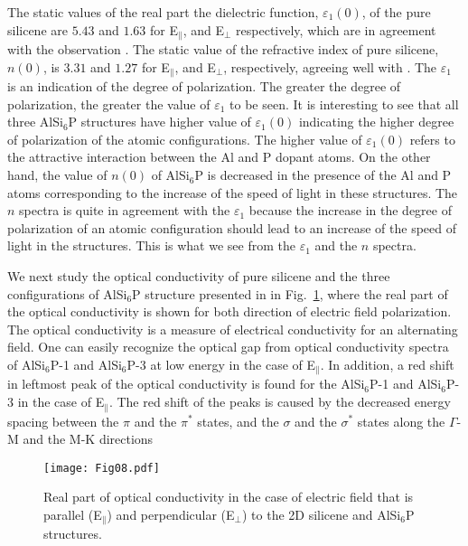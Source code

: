 \documentclass[5p,twocolumn]{elsarticle}
\def\fig#1{Fig.\ \ref{#1}}
\begin{document}
The static values of the real part the dielectric function, $\varepsilon_1(0)$, of the pure silicene are $5.43$ and $1.63$ for E$_{\parallel}$, and  E$_{\bot}$ respectively, which are in agreement
with the observation \cite{C4RA07976K}. The static value of the refractive index of pure silicene, $n(0)$, is $3.31$ and $1.27$ for E$_{\parallel}$, and  E$_{\bot}$, respectively, agreeing well with \cite{doi:10.1063/1.5062764}. The $\varepsilon_1$ is an indication of the degree of polarization. The greater the degree of polarization, the greater the value of $\varepsilon_1$ to be seen. It is interesting to see that all three AlSi$_6$P structures have higher value of $\varepsilon_1(0)$ indicating the higher degree of polarization of the atomic configurations. The higher value of $\varepsilon_1(0)$ refers to the attractive interaction between the Al and P dopant atoms. 
On the other hand, the value of $n(0)$ of AlSi$_6$P is decreased in the presence of the Al and P atoms
corresponding to the increase of the speed of light in these structures. The $n$ spectra is quite in agreement with the $\varepsilon_1$ because the increase in the degree of polarization of an atomic configuration should lead to an increase of the speed of light in the structures. This is what we see from 
the $\varepsilon_1$ and the $n$ spectra.

We next study the optical conductivity of pure silicene and the three configurations of AlSi$_6$P structure presented in in \fig{fig08}, where the real part of the optical conductivity is shown for 
both direction of electric field polarization. The optical conductivity is a measure of electrical conductivity for an alternating field. One can easily recognize the optical gap from optical conductivity spectra of AlSi$_6$P-1 and AlSi$_6$P-3 at low energy in the case of E$_{\parallel}$. In addition, a red shift in leftmost peak of the optical conductivity is found for the AlSi$_6$P-1 and AlSi$_6$P-3 in the case of E$_{\parallel}$. The red shift of the peaks is caused by the decreased energy spacing between the $\pi$ and the $\pi^*$ states, and the $\sigma$ and the $\sigma^*$ states along the $\Gamma$-M and the M-K directions 

\begin{figure}[htb]
	\centering
	\texttt{[image: Fig08.pdf]}
	\caption{Real part of optical conductivity in the case of electric field that is parallel (E$_{\parallel}$) and perpendicular (E$_{\bot}$) to the 2D silicene and AlSi$_6$P structures.}
	\label{fig08}
\end{figure}
\end{document}
